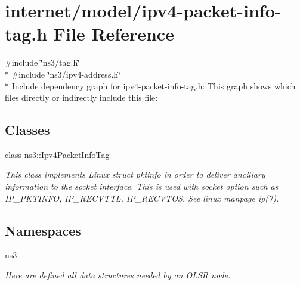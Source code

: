 \hypertarget{ipv4-packet-info-tag_8h}{}\section{internet/model/ipv4-\/packet-\/info-\/tag.h File Reference}
\label{ipv4-packet-info-tag_8h}
{\ttfamily \#include \char`\"{}ns3/tag.\+h\char`\"{}}\\*
{\ttfamily \#include \char`\"{}ns3/ipv4-\/address.\+h\char`\"{}}\\*
Include dependency graph for ipv4-\/packet-\/info-\/tag.h\+:
This graph shows which files directly or indirectly include this file\+:
\subsection*{Classes}
\begin{DoxyCompactItemize}
\item 
class \hyperlink{classns3_1_1Ipv4PacketInfoTag}{ns3\+::\+Ipv4\+Packet\+Info\+Tag}
\begin{DoxyCompactList}\small\item\em This class implements Linux struct pktinfo in order to deliver ancillary information to the socket interface. This is used with socket option such as I\+P\+\_\+\+P\+K\+T\+I\+N\+FO, I\+P\+\_\+\+R\+E\+C\+V\+T\+TL, I\+P\+\_\+\+R\+E\+C\+V\+T\+OS. See linux manpage ip(7). \end{DoxyCompactList}\end{DoxyCompactItemize}
\subsection*{Namespaces}
\begin{DoxyCompactItemize}
\item 
 \hyperlink{namespacens3}{ns3}
\begin{DoxyCompactList}\small\item\em Here are defined all data structures needed by an O\+L\+SR node. \end{DoxyCompactList}\end{DoxyCompactItemize}
